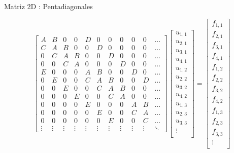 \documentclass{beamer}
\begin{document}
\begin{frame}{Matriz 2D : Pentadiagonales}

{\tiny \[
	\left[
	\begin{array}{cccc|cccc|ccc}
	A & B & 0 & 0 & D & 0 & 0 & 0 & 0 & 0 & \dots\\
	C & A & B & 0 & 0 & D & 0 & 0 & 0 & 0 & \dots\\
	0 & C & A & B & 0 & 0 & D & 0 & 0 & 0 & \dots\\
	0 & 0 & C & A & 0 & 0 & 0 & D & 0 & 0 & \dots\\
	\hline
	E & 0 & 0 & 0 & A & B & 0 & 0 & D & 0 & \dots\\
	0 & E & 0 & 0 & C & A & B & 0 & 0 & D & \dots\\
	0 & 0 & E & 0 & 0 & C & A & B & 0 & 0 & \dots\\
	0 & 0 & 0 & E & 0 & 0 & C & A & 0 & 0 & \dots\\
	\hline
	0 & 0 & 0 & 0 &  E & 0 & 0 & 0 & A & B & \dots\\
	0 & 0 & 0 & 0 &  0 & E & 0 & 0 & C & A & \dots\\
	0 & 0 & 0 & 0 &  0 & 0 & E & 0 & 0 & C & \dots\\
	\vdots & \vdots & \vdots & \vdots & \vdots & \vdots & \vdots & \vdots & \vdots & \vdots & \ddots 
	\end{array} \right]
	\left[
	\begin{array}{c}
	u_{1,1} \\ u_{2,1} \\ u_{3,1}  \\ u_{4,1} \\ \hline
	u_{1,2} \\ u_{2,2} \\ u_{3,2}  \\ u_{4,2} \\ \hline
	u_{1,3} \\ u_{2,3} \\ u_{3,3}  \\ \vdots \\
	\end{array}
	\right] = 
	\left[
	\begin{array}{c}
	f_{1,1} \\ f_{2,1} \\ f_{3,1}  \\ f_{4,1} \\ \hline
	f_{1,2} \\ f_{2,2} \\ f_{3,2}  \\ f_{4,2} \\ \hline
	f_{1,3} \\ f_{2,3} \\ f_{3,3}  \\ \vdots \\
	\end{array}
	\right]	
	\]}


\end{frame}
\end{document}
